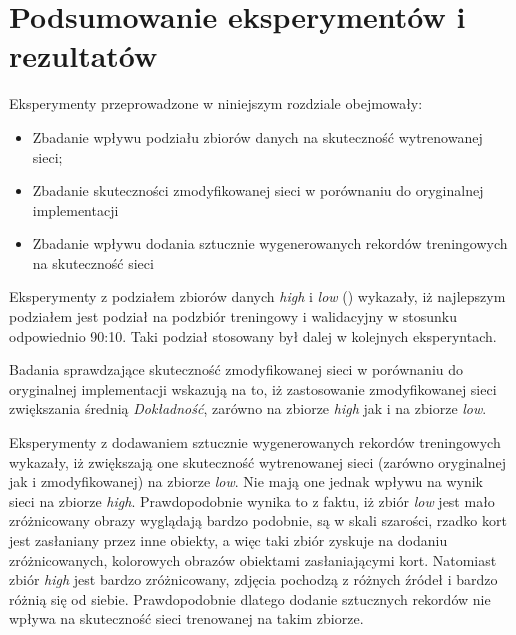 \section{Podsumowanie eksperymentów i rezultatów}
Eksperymenty przeprowadzone w niniejszym rozdziale obejmowały:
\begin{itemize}
 \item Zbadanie wpływu podziału zbiorów danych na skuteczność wytrenowanej sieci;
 \item Zbadanie skuteczności zmodyfikowanej sieci w porównaniu do oryginalnej implementacji
 \item Zbadanie wpływu dodania sztucznie wygenerowanych rekordów treningowych na skuteczność sieci
\end{itemize}

Eksperymenty z podziałem zbiorów danych \textit{high} i \textit{low} () wykazały, iż najlepszym podziałem jest podział na podzbiór treningowy i walidacyjny w stosunku odpowiednio 90:10. Taki podział stosowany był dalej w kolejnych eksperyntach.


Badania sprawdzające skuteczność zmodyfikowanej sieci w porównaniu do oryginalnej implementacji wskazują na to, iż zastosowanie zmodyfikowanej sieci zwiększania średnią \textit{Dokładność}, zarówno na zbiorze \textit{high} jak i na zbiorze \textit{low}.


Eksperymenty z dodawaniem sztucznie wygenerowanych rekordów treningowych wykazały, iż zwiększają one skuteczność wytrenowanej sieci (zarówno oryginalnej jak i zmodyfikowanej) na zbiorze \textit{low}. Nie mają one jednak wpływu na wynik sieci na zbiorze \textit{high}. Prawdopodobnie wynika to z faktu, iż zbiór \textit{low} jest mało zróżnicowany obrazy wyglądają bardzo podobnie, są w skali szarości, rzadko kort jest zasłaniany przez inne obiekty, a więc taki zbiór zyskuje na dodaniu zróżnicowanych, kolorowych obrazów obiektami zasłaniającymi kort. Natomiast zbiór \textit{high} jest bardzo zróżnicowany, zdjęcia pochodzą z różnych źródeł i bardzo różnią się od siebie. Prawdopodobnie dlatego dodanie sztucznych rekordów nie wpływa na skuteczność sieci trenowanej na takim zbiorze.
